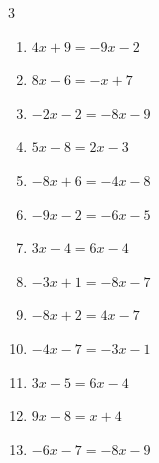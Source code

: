 \begin{multicols}{3}
\begin{enumerate}

  \item $4x+9=-9x-2$


  \item $8x-6=-x+7$


  \item $-2x-2=-8x-9$


  \item $5x-8=2x-3$


\columnbreak %

  \item $-8x+6=-4x-8$


  \item $-9x-2=-6x-5$

        \phantom{$\displaystyle x=1$}

  \item $3x-4=6x-4$

        \phantom{$\displaystyle x=0$}

  \item $-3x+1=-8x-7$


  \item $-8x+2=4x-7$


  \item $-4x-7=-3x-1$

        \phantom{$\displaystyle x=-6$}

  \item $3x-5=6x-4$


  \item $9x-8=x+4$


  \item $-6x-7=-8x-9$

        \phantom{$\displaystyle x=-1$}


\end{enumerate}
\end{multicols}
